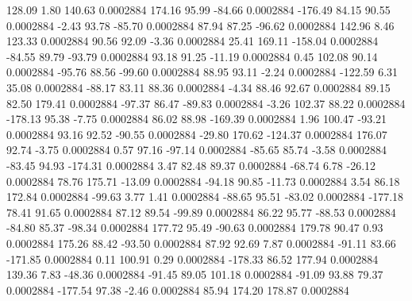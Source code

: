       128.09        1.80      140.63     0.0002884
      174.16       95.99      -84.66     0.0002884
     -176.49       84.15       90.55     0.0002884
       -2.43       93.78      -85.70     0.0002884
       87.94       87.25      -96.62     0.0002884
      142.96        8.46      123.33     0.0002884
       90.56       92.09       -3.36     0.0002884
       25.41      169.11     -158.04     0.0002884
      -84.55       89.79      -93.79     0.0002884
       93.18       91.25      -11.19     0.0002884
        0.45      102.08       90.14     0.0002884
      -95.76       88.56      -99.60     0.0002884
       88.95       93.11       -2.24     0.0002884
     -122.59        6.31       35.08     0.0002884
      -88.17       83.11       88.36     0.0002884
       -4.34       88.46       92.67     0.0002884
       89.15       82.50      179.41     0.0002884
      -97.37       86.47      -89.83     0.0002884
       -3.26      102.37       88.22     0.0002884
     -178.13       95.38       -7.75     0.0002884
       86.02       88.98     -169.39     0.0002884
        1.96      100.47      -93.21     0.0002884
       93.16       92.52      -90.55     0.0002884
      -29.80      170.62     -124.37     0.0002884
      176.07       92.74       -3.75     0.0002884
        0.57       97.16      -97.14     0.0002884
      -85.65       85.74       -3.58     0.0002884
      -83.45       94.93     -174.31     0.0002884
        3.47       82.48       89.37     0.0002884
      -68.74        6.78      -26.12     0.0002884
       78.76      175.71      -13.09     0.0002884
      -94.18       90.85      -11.73     0.0002884
        3.54       86.18      172.84     0.0002884
      -99.63        3.77        1.41     0.0002884
      -88.65       95.51      -83.02     0.0002884
     -177.18       78.41       91.65     0.0002884
       87.12       89.54      -99.89     0.0002884
       86.22       95.77      -88.53     0.0002884
      -84.80       85.37      -98.34     0.0002884
      177.72       95.49      -90.63     0.0002884
      179.78       90.47        0.93     0.0002884
      175.26       88.42      -93.50     0.0002884
       87.92       92.69        7.87     0.0002884
      -91.11       83.66     -171.85     0.0002884
        0.11      100.91        0.29     0.0002884
     -178.33       86.52      177.94     0.0002884
      139.36        7.83      -48.36     0.0002884
      -91.45       89.05      101.18     0.0002884
      -91.09       93.88       79.37     0.0002884
     -177.54       97.38       -2.46     0.0002884
       85.94      174.20      178.87     0.0002884
